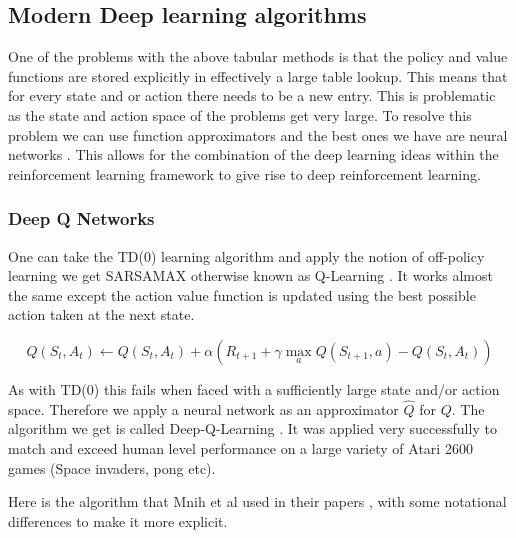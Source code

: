 \subsection{Modern Deep learning algorithms}\label{sec:MDLA}

One of the problems with the above tabular methods is that the policy and value functions are stored explicitly in effectively a large table lookup. This means that for every state and or action there needs to be a new entry. This is problematic as the state and action space of the problems get very large. To resolve this problem we can use function approximators and the best ones we have are neural networks \cite{hornikMultilayerFeedforwardNetworks1989}. This allows for the combination of the deep learning ideas within the reinforcement learning framework to give rise to deep reinforcement learning.

\subsubsection{Deep Q Networks}
\label{subsec:DQN}

One can take the TD(0) learning algorithm and apply the notion of off-policy learning we get SARSAMAX otherwise known as Q-Learning \cite{watkinsLearningDelayedReward1989} \cite{watkinsQlearning1992} . It works almost the same except the action value function is updated using the best possible action taken at the next state.

\begin{equation}
Q(S_{t}, A_{t}) \leftarrow Q(S_{t}, A_{t}) + \alpha \left( R_{t+1}+\gamma \max_{a} Q(S_{t+1}, a) - Q(S_{t}, A_{t}) \right) 
\end{equation}

As with TD(0) this fails when faced with a sufficiently large state and/or action space. Therefore we apply a neural network as an approximator $\hat{Q}$ for $Q$. The algorithm we get is called Deep-Q-Learning \cite{mnihPlayingAtariDeep2013}\cite{mnihHumanlevelControlDeep2015}. It was applied very successfully to match and exceed human level performance on a large variety of Atari 2600 games (Space invaders, pong etc).

Here is the algorithm that Mnih et al used in their papers \cite{mnihPlayingAtariDeep2013} \cite{mnihHumanlevelControlDeep2015}, with some notational differences to make it more explicit.

